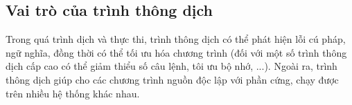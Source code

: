 \subsection{Vai trò của trình thông dịch}
Trong quá trình dịch và thực thi, trình thông dịch có thể phát hiện lỗi cú pháp, ngữ nghĩa, đồng thời có thể tối ưu hóa chương trình (đối với một số trình thông dịch cấp cao có thể giảm thiểu số câu lệnh, tôi ưu bộ nhớ, ...). Ngoài ra, trình thông dịch giúp cho các chương trình nguồn độc lập với phần cứng, chạy được trên nhiều hệ thống khác nhau.
